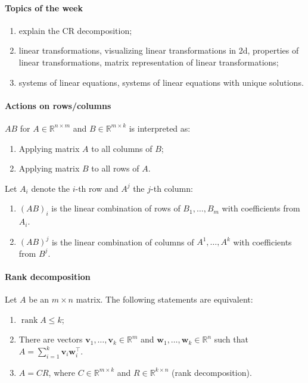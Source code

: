 \documentclass{article}
\begin{document}
\paragraph{Topics of the week} 

\begin{enumerate}
    \item explain the CR decomposition;
    \item  linear transformations, visualizing linear transformations in 2d, properties of linear transformations, matrix representation of linear transformations;
    \item systems of linear equations, systems of linear equations with unique solutions.
\end{enumerate}

\paragraph{Actions on rows/columns} $AB$ for $A \in \mathbb R^{n \times m}$ and $B \in \mathbb R^{m \times k}$ is interpreted as:

\begin{enumerate}
    \item Applying matrix $A$ to all columns of $B$;
    \item Applying matrix $B$ to all rows of $A$.
\end{enumerate}

Let $A_i$ denote the $i$-th row and $A^j$ the $j$-th column:

\begin{enumerate}
    \item $(AB)_i$ is the linear combination of rows of $B_1,\dots,B_m$ with coefficients from $A_i$.
    \item $(AB)^j$ is the linear combination of columns of $A^1,\dots,A^k$ with coefficients from $B^j$.
\end{enumerate}

\paragraph{Rank decomposition} Let $A$ be an $m \times n$ matrix. The following statements are equivalent:
\begin{enumerate}
    \item $\operatorname{rank} A \leq k$;
    \item There are vectors $\mathbf{v}_1,\dots,\mathbf{v}_k \in \mathbb R^m$ and $\mathbf{w}_1,\dots,\mathbf{w}_k \in \mathbb R^n$ such that $A = \sum\limits_{i=1}^k \mathbf{v}_i \mathbf{w}_i^\top$.
    \item $A = CR$, where $C \in \mathbb R^{m \times k}$ and $R \in \mathbb R^{k \times n}$ (rank decomposition).
\end{enumerate}
\end{document}
